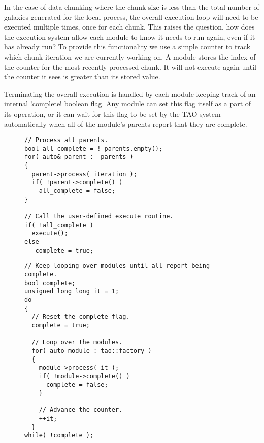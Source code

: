 \documentclass[14pt]{article}
\begin{document}
In the case of data chunking where the chunk size is less than the total number
of galaxies generated for the local process, the overall execution loop will
need to be executed multiple times, once for each chunk. This raises the
question, how does the execution system allow each module to know it needs
to run again, even if it has already run? To provide this functionality we
use a simple counter to track which chunk iteration we are currently working on.
A module stores the index of the counter for the most recently processed chunk.
It will not execute again until the counter it sees is greater than its
stored value.

Terminating the overall execution is handled by each module keeping track
of an internal \lstverb!complete! boolean flag. Any module can set this
flag itself as a part of its operation, or it can wait for this flag to
be set by the TAO system automatically when all of the module's parents
report that they are complete.

\begin{figure}
  \begin{lstlisting}
// Process all parents.
bool all_complete = !_parents.empty();
for( auto& parent : _parents )
{
  parent->process( iteration );
  if( !parent->complete() )
    all_complete = false;
}

// Call the user-defined execute routine.
if( !all_complete )
  execute();
else
  _complete = true;
  \end{lstlisting}
\end{figure}

\begin{figure}
  \begin{lstlisting}
// Keep looping over modules until all report being complete.
bool complete;
unsigned long long it = 1;
do
{
  // Reset the complete flag.
  complete = true;

  // Loop over the modules.
  for( auto module : tao::factory )
  {
    module->process( it );
    if( !module->complete() )
      complete = false;
    }

    // Advance the counter.
    ++it;
  }
while( !complete );
  \end{lstlisting}
\end{figure}
\end{document}
